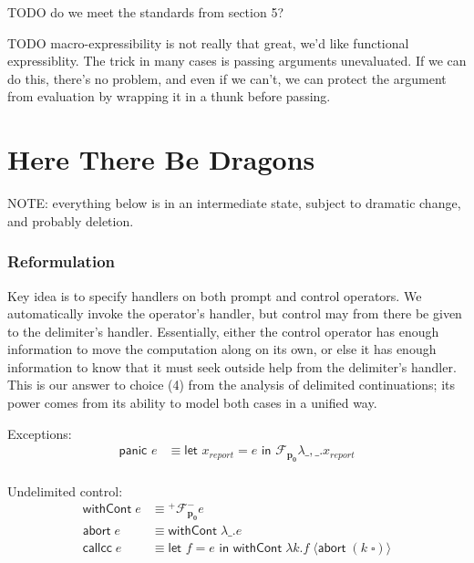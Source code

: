 \documentclass[11pt]{article}
\newcommand{\maybePage}{\newpage}
\newcommand{\letin}[2]{\textsf{let }#1\textsf{ in }#2}
\newcommand\F{\mathcal{F}}
\newcommand{\angles}[1]{\langle#1\rangle}
\begin{document}
TODO do we meet the standards from section 5?

TODO macro-expressibility is not really that great, we'd like functional expressiblity.
The trick in many cases is passing arguments unevaluated. If we can do this, there's no problem, and even if we can't, we can protect the argument from evaluation by wrapping it in a thunk before passing.















\maybePage
\part{Here There Be Dragons}

NOTE: everything below is in an intermediate state, subject to dramatic change, and probably deletion.



\section{Reformulation}

Key idea is to specify handlers on both prompt and control operators.
We automatically invoke the operator's handler, but control may from there be given to the delimiter's handler.
Essentially, either the control operator has enough information to move the computation along on its own, or else it has enough information to know that it must seek outside help from the delimiter's handler.
This is our answer to choice (4) from the analysis of delimited continuations; its power comes from its ability to model both cases in a unified way.


Exceptions:
\begin{align*}
\textsf{panic }e &\equiv
	\letin{x_{report} = e}{\F_\mathbf{p_0}\lambda \_,\_.x_{report}}
	\\
\end{align*}

Undelimited control:
\begin{align*}
\textsf{withCont}\;e &\equiv
	{}^+\F^-_\mathbf{p_0}e
	\\
\textsf{abort}\;e &\equiv
	\textsf{withCont}\;\lambda \_.e
	\\
\textsf{callcc}\;e &\equiv
	\letin{f=e}{\textsf{withCont}\;\lambda k. f\; \angles{\textsf{abort}\;(k\;\square)}}
	\\
\end{align*}
\end{document}
